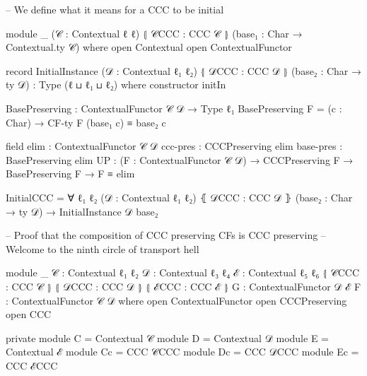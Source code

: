 \begin{code}[hide]
-- We define what it means for a CCC to be initial

module _ (𝒞 : Contextual ℓ ℓ) ⦃ 𝒞CCC : CCC 𝒞 ⦄ (base₁ : Char → Contextual.ty 𝒞) where
  open Contextual
  open ContextualFunctor

  record InitialInstance (𝒟 : Contextual ℓ₁ ℓ₂) ⦃ 𝒟CCC : CCC 𝒟 ⦄ (base₂ : Char → ty 𝒟)
                         : Type (ℓ ⊔ ℓ₁ ⊔ ℓ₂) where
    constructor initIn

    BasePreserving : ContextualFunctor 𝒞 𝒟 → Type ℓ₁
    BasePreserving F = (c : Char) → CF-ty F (base₁ c) ≡ base₂ c

    field
      elim : ContextualFunctor 𝒞 𝒟
      ccc-pres : CCCPreserving elim
      base-pres : BasePreserving elim
      UP : (F : ContextualFunctor 𝒞 𝒟) → CCCPreserving F → BasePreserving F → F ≡ elim

  InitialCCC = ∀ {ℓ₁} {ℓ₂} (𝒟 : Contextual ℓ₁ ℓ₂) ⦃ 𝒟CCC : CCC 𝒟 ⦄ (base₂ : Char → ty 𝒟) →
    InitialInstance 𝒟 base₂

-- Proof that the composition of CCC preserving CFs is CCC preserving
-- Welcome to the ninth circle of transport hell

module _ {𝒞 : Contextual ℓ₁ ℓ₂} {𝒟 : Contextual ℓ₃ ℓ₄} {ℰ : Contextual ℓ₅ ℓ₆}
         ⦃ 𝒞CCC : CCC 𝒞 ⦄ ⦃ 𝒟CCC : CCC 𝒟 ⦄ ⦃ ℰCCC : CCC ℰ ⦄
         {G : ContextualFunctor 𝒟 ℰ} {F : ContextualFunctor 𝒞 𝒟} where
  open ContextualFunctor
  open CCCPreserving
  open CCC

  private
    module C = Contextual 𝒞
    module D = Contextual 𝒟
    module E = Contextual ℰ
    module Cc = CCC 𝒞CCC
    module Dc = CCC 𝒟CCC
    module Ec = CCC ℰCCC


\end{code}
